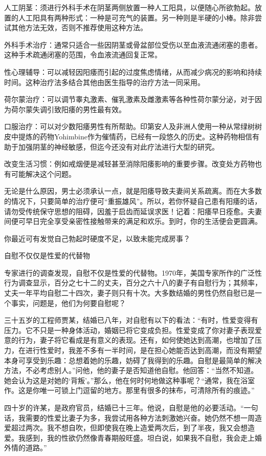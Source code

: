 \documentclass[12pt,UTF8]{ctexbook}
\begin{document}
人工阴茎：须进行外科手术在阴茎两侧放置一种人工阳具，以便随心所欲勃起。放置的人工阳具有两种形式：一种是可充气的装置。另一种则是半硬的小棒。除非尝试其他方法无效，否则不推荐使用这种方法。

外科手术治疗：通常只适合一些因阴茎或骨盆部位受伤以至血液流通闭塞的患者。这种手术疏通闭塞的范围，令血液流通回复正常。

性心理辅导：可以减轻因阳痿而引起的过度焦虑情绪，从而减少病况的影响和持续时间。这种治疗法多结合其他由医生指导的治疗方法一同采用。

荷尔蒙治疗：可以调节睾丸激素、催乳激素及雌激素等各种性荷尔蒙分泌，对于因为荷尔蒙失调引致阳痿的男性最有效。

口服治疗：可以对少数阳痿男性有所帮助。印第安人及非洲人使用一种从常绿树树皮中提炼的药物Yohimbine作为催情药，已经有一段悠久的历史。这种药物相信有助于加强阴茎的神经敏感，但迄今还没有对此疗法进行大型的研究。

改变生活习惯：例如戒烟便是减轻甚至消除阳痿影响的重要步骤。改变处方药物也有可能解决这个问题。

无论是什么原因，男士必须承认一点，就是阳痿导致夫妻间关系疏离。而在大多数的情况下，只要简单的治疗便可“重振雄风”。所以，若你怀疑自己患有阳痿的话，请勿受传统保守思想的阻碍，因羞于启齿而延误求医！记着：阳痿早日痊愈。夫妻间便可早日完全享受亲密性接触带来的满足和欢乐。到时，你的生活便会更圆满。

你最近可有发觉自己勃起时硬度不足，以致未能完成房事？





自慰不仅仅是性爱的代替物


专家进行的调查发现，自慰不仅是性爱的代替物。1970年，美国专家所作的广泛性行为调查显示，百分之七十二的丈夫，百分之六十八的妻子有自慰行为；其频率，丈夫一年平均自慰二十四次，妻子则只有十次。大多数结婚的男性仍然自慰已是一个事实，问题是，他们为何要自慰呢？

三十五岁的工程师贾某，结婚已八年，对自慰有以下的看法：“有时，性爱变得有压力。它不只是一种身体活动，婚姻已将它变成负担。性爱变成了你对妻子表现爱意的行为，妻子将它看成是有意义的表现。还有，如何使她达到高潮，也增加了压力，在进行性爱时，我差不多有一半时间，是在担心她能否达到高潮，而没有期望本身可享受到乐趣：总想着她的乐趣，妨碍了我得到的乐趣。自慰是最简单的解决方法，不必考虑别人。”问他，他的妻子是否知道他自慰。他回答：“当然不知道。她会认为这是对她的‘背叛’。”那么，他在何时何地做这种事呢？“通常，我在浴室作。这是你唯一可锁上门逗留的地方。那里有很多的抹布，可清除所有的痕迹。”

四十岁的许某，是政府官员，结婚已十三年。他说，自慰是他的必要活动。“一句话，我需要的性爱比妻子为多，我尝试用各种方法刺激她兴奋。她仍然不想一周造爱超过两次。我不想自吹，但即使我在晚上造爱两次后，到了半夜，我又会想造爱。我感到，我的性欲仍然像青春期般旺盛。坦白说，如果我不自慰，我会走上婚外情的道路。”
\end{document}
